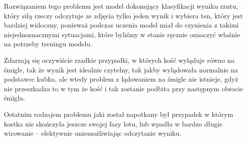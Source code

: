 Rozwiązaniem tego problemu jest model dokonujący klasyfikacji wyniku rzutu, który siłą rzeczy odczytuje ze zdjęcia tylko jeden wynik i wybiera ten,
który jest bardziej widoczny, ponieważ podczas uczenia model miał do czynienia z takimi niejednoznacznymi sytuacjami,
które byliśmy w stanie ręcznie oznaczyć właśnie na potrzeby treningu modelu.

Zdarzają się oczywiście rzadkie przypadki, w których kość wyląduje równo na śmigle, tak że wynik jest idealnie czytelny,
tak jakby wylądowała normalnie na podstawce kubka, ale wtedy problem z lądowaniem na śmigle nie istnieje,
gdyż nie przeszkadza to w tym że kość i tak zostanie podbita przy następnym obrocie śmigła.


Ostatnim rodzajem problemu jaki został napotkany był przypadek w którym kostka nie skończyła jeszcze swojej fazy lotu,
lub wpadła w bardzo długie wirowanie -- efektywnie uniemożliwiając odczytanie wyniku.

